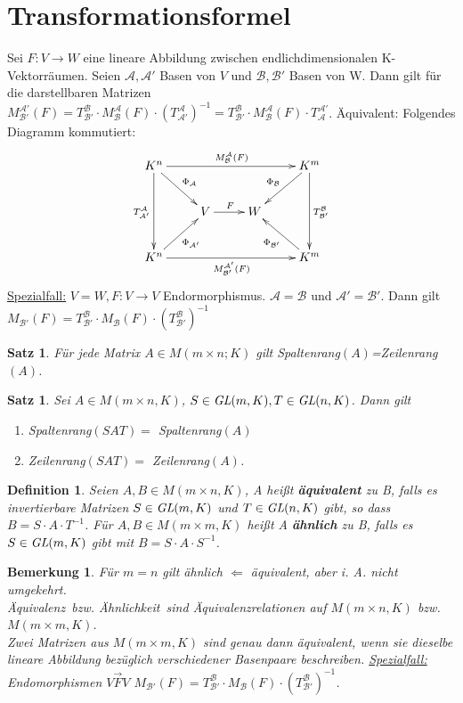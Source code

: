 \documentclass[12pt,a4paper]{article}
\theoremstyle{plain}
\newtheorem{Satz}[Theorem]{Satz}
\newtheorem{Definition}[Theorem]{Definition}
\newtheorem{Bemerkung}[Theorem]{Bemerkung}
\newcommand{\herv}[1]{{\emph{\textbf{#1}}}}
\numberwithin{equation}{section}
\begin{document}
\section{Transformationsformel}
Sei $F:V\rightarrow W$ eine lineare Abbildung zwischen endlichdimensionalen K-Vektorräumen. Seien $\mathcal{A},\mathcal{A'}$ Basen von $V$ und $\mathcal{B}, \mathcal{B'}$ Basen von W. Dann gilt für die darstellbaren Matrizen $M^\mathcal{A'}_\mathcal{B'}(F)=T^\mathcal{B}_\mathcal{B'}\cdot M^\mathcal{A}_\mathcal{B}(F)\cdot \left(T^\mathcal{A}_\mathcal{A'}\right)^{-1}=T^\mathcal{B}_\mathcal{B'}\cdot M^\mathcal{A}_\mathcal{B}(F)\cdot T^\mathcal{A'}_\mathcal{A}$. Äquivalent: Folgendes Diagramm kommutiert:
\[ \begin{xy}
	\xymatrix{
		K^n \ar[rrr]^{M^\mathcal{A}_\mathcal{B}(F)} \ar[dr]^{\Phi_\mathcal{A}} \ar[dd]_{T^\mathcal{A}_\mathcal{A'}} & & & K^m \ar[dl]_{\Phi_\mathcal{B}} \ar[dd]^{T^\mathcal{B}_\mathcal{B'}} \\
		&  V \ar[r]^F & W & \\
		K^n \ar[ur]_{\Phi_\mathcal{A'}} \ar[rrr]_{M^\mathcal{A'}_\mathcal{B'}(F)} & & & K^m \ar[ul]^{\Phi_\mathcal{B'}}
	}
\end{xy} \]
\underline{Spezialfall:} $V=W, F: V\rightarrow V$ Endormorphismus. $\mathcal{A}=\mathcal{B}$ und $\mathcal{A'}=\mathcal{B'}$. Dann gilt $M_\mathcal{B'}(F)=T^\mathcal{B}_\mathcal{B'}\cdot M_\mathcal{B}(F)\cdot\left( T^\mathcal{B}_\mathcal{B'}\right)^{-1}$
\begin{Satz}
Für jede Matrix $A\in M(m\times n;K)$ gilt Spaltenrang$(A)$=Zeilenrang$(A)$.
\end{Satz}
\begin{Satz}
Sei $A\in M(m\times n,K)$, $S\in\emph{GL}(m,K), T\in\emph{GL}(n,K)$. Dann gilt \begin{enumerate}
\renewcommand{\labelenumi}{\emph{\arabic{enumi})}}
\item Spaltenrang$(SAT)=$ Spaltenrang$(A)$
\item Zeilenrang$(SAT)=$ Zeilenrang$(A)$.
\end{enumerate}
\end{Satz}
\begin{Definition}
Seien $A,B\in M(m\times n, K)$, A heißt \herv{äquivalent} zu B, falls es invertierbare Matrizen $S\in \emph{GL}(m,K)$ und $T\in \emph{GL}(n,K)$ gibt, so dass $B=S\cdot A\cdot T^{-1}$. Für $A,B\in M(m\times m,K)$ heißt A \herv{ähnlich} zu B, falls es $S\in \emph{GL}(m,K)$ gibt mit $B=S\cdot A\cdot S^{-1}$.
\end{Definition}
\begin{Bemerkung}
Für $m=n$ gilt ähnlich $\Leftarrow$ äquivalent, aber i. A. nicht umgekehrt.\\
\glqq Äquivalenz\grqq\ bzw. \glqq Ähnlichkeit\grqq\ sind Äquivalenzrelationen auf $M(m\times n,K)$ bzw. $M(m\times m,K)$. \\
Zwei Matrizen aus $M(m\times m,K)$ sind genau dann äquivalent, wenn sie dieselbe lineare Abbildung bezüglich verschiedener Basenpaare beschreiben. \underline{Spezialfall:} Endomorphismen $V\overrightarrow{F} V$ $M_\mathcal{B'}(F)=T^\mathcal{B}_\mathcal{B'}\cdot M_\mathcal{B}(F)\cdot \left(T^\mathcal{B}_\mathcal{B'} \right)^{-1}$.
\end{Bemerkung}
\end{document}
